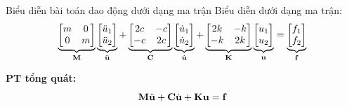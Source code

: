 \documentclass[aspectratio=169, t]{beamer} %
\begin{document}
\begin{frame}{Biểu diễn bài toán dao động dưới dạng ma trận}
    Biểu diễn dưới dạng ma trận:
    \begin{equation}\label{eq_PT2dofs_c_matrix}
        \underbrace{\begin{bmatrix}
            m & 0\\ 0 & m
        \end{bmatrix}}_{\bf M}\underbrace{\begin{bmatrix}
            \ddot{u}_1 \\ \ddot{u}_2
        \end{bmatrix}}_{\ddot{\bf u}} + \underbrace{\begin{bmatrix}
            2c & -c \\ -c & 2c
        \end{bmatrix}}_{\bf C}\underbrace{\begin{bmatrix}
            \dot{u}_1 \\ \dot{u}_2
        \end{bmatrix}}_{\dot{\bf u}} +\underbrace{\begin{bmatrix}
            2k & -k \\ -k & 2k
        \end{bmatrix}}_{\bf K} \underbrace{\begin{bmatrix}
            u_1 \\ u_2
        \end{bmatrix}}_{\bf u} = \underbrace{\begin{bmatrix}
            f_1 \\ f_2
        \end{bmatrix}}_{\bf f} 
    \end{equation}

    \textbf{PT tổng quát:}
        \begin{equation}\label{eq_PTmatrix}
            {\bf M}\ddot{\bf u} + {\bf C}\dot{\bf u} + {\bf K}{\bf u} = {\bf f}
        \end{equation}
\end{frame}
\end{document}
